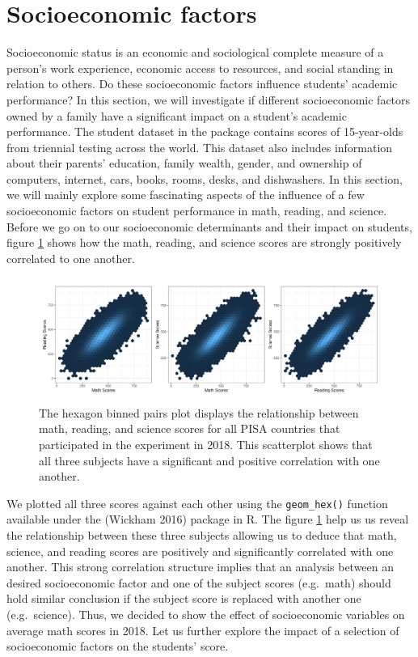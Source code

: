 \hypertarget{socioeconomic-factors}{%
\section{Socioeconomic factors}\label{socioeconomic-factors}}

Socioeconomic status is an economic and sociological complete measure of a person's work experience, economic access to resources, and social standing in relation to others. Do these socioeconomic factors influence students' academic performance? In this section, we will investigate if different socioeconomic factors owned by a family have a significant impact on a student's academic performance. The student dataset in the  package contains scores of 15-year-olds from triennial testing across the world. This dataset also includes information about their parents' education, family wealth, gender, and ownership of computers, internet, cars, books, rooms, desks, and dishwashers. In this section, we will mainly explore some fascinating aspects of the influence of a few socioeconomic factors on student performance in math, reading, and science. Before we go on to our socioeconomic determinants and their impact on students, figure \ref{fig:corr-plot} shows how the math, reading, and science scores are strongly positively correlated to one another.

\begin{figure}[H]
\includegraphics[width=1\linewidth]{figures/hexbin} \caption{The hexagon binned pairs plot displays the relationship between math, reading, and science scores for all PISA countries that participated in the experiment in 2018. This scatterplot shows that all three subjects have a significant and positive correlation with one another.}\label{fig:corr-plot}
\end{figure}

We plotted all three scores against each other using the \texttt{geom\_hex()} function available under the  (Wickham 2016) package in R. The figure \ref{fig:corr-plot} help us us reveal the relationship between these three subjects allowing us to deduce that math, science, and reading scores are positively and significantly correlated with one another. This strong correlation structure implies that an analysis between an desired socioeconomic factor and one of the subject scores (e.g.~math) should hold similar conclusion if the subject score is replaced with another one (e.g.~science). Thus, we decided to show the effect of socioeconomic variables on average math scores in 2018. Let us further explore the impact of a selection of socioeconomic factors on the students' score.

